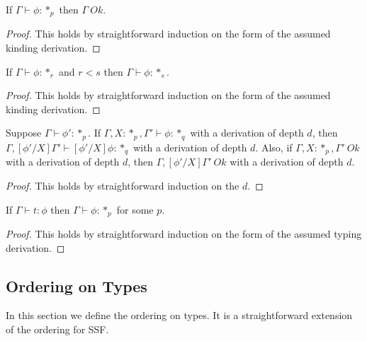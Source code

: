 \begin{lemma}
  If $\Gamma \vdash \phi:*_p$ then $\Gamma\ Ok$.
  \label{lemma:kinding_ok_ssfp}
\end{lemma}
\begin{proof}
  This holds by straightforward induction on the form of the assumed
  kinding derivation.
\end{proof}

\begin{lemma}
  If $\Gamma \vdash \phi:*_r$ and $r < s$ then $\Gamma \vdash \phi:*_s$.
  \label{lemma:level_weakening_for_kinding_ssfp}
\end{lemma}
\begin{proof}
  This holds by straightforward induction on the form of the assumed
  kinding derivation.
\end{proof}

\begin{lemma}
  Suppose $\Gamma \vdash \phi':*_p$.  If $\Gamma,X:*_p,\Gamma' \vdash \phi:*_q$ 
  with a derivation of depth $d$, then $\Gamma,[\phi'/X]\Gamma' \vdash [\phi'/X]\phi:*_q$
  with a derivation of depth $d$.
  Also, if $\Gamma,X:*_p,\Gamma'\ Ok$ with a derivation of depth $d$, then 
  $\Gamma,[\phi'/X]\Gamma'\ Ok$ with a derivation of depth $d$.
  \label{lemma:substitution_for_kinding_ssfp}
\end{lemma}
\begin{proof}
  This holds by straightforward induction on the $d$.
\end{proof}

\begin{lemma}[Regularity]
  If $\Gamma \vdash t:\phi$ then $\Gamma \vdash \phi:*_p$ for some $p$.
  \label{lemma:regularity_ssfp}
\end{lemma}
\begin{proof}
  This holds by straightforward induction on the form of the assumed
  typing derivation.
\end{proof}

\subsection{Ordering on Types}
\label{subsec:ordering_on_types_ssfp}
In this section we define the ordering on types. It is a
straightforward extension of the ordering for SSF.

